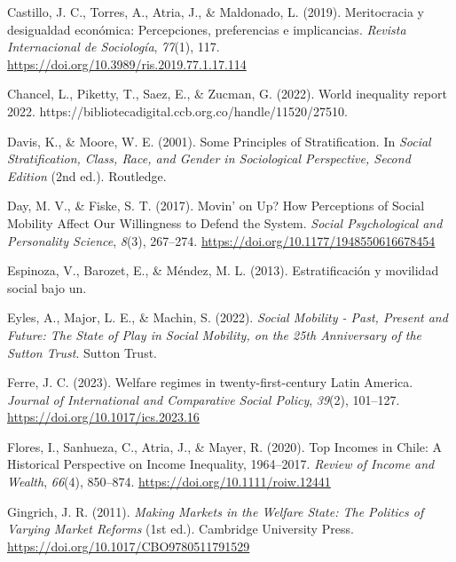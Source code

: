 \documentclass[
  12pt,
]{article}
\newlength{\cslhangindent}
\newenvironment{CSLReferences}[2] %
 {\begin{list}{}{%
  \setlength{\itemindent}{0pt}
  \setlength{\leftmargin}{0pt}
  \setlength{\parsep}{0pt}
  \ifodd #1
   \setlength{\leftmargin}{\cslhangindent}
   \setlength{\itemindent}{-1\cslhangindent}
  \fi
  \setlength{\itemsep}{#2\baselineskip}}}
 {\end{list}}
\begin{document}
\begin{CSLReferences}{1}{0}
Castillo, J. C., Torres, A., Atria, J., \& Maldonado, L. (2019).
Meritocracia y desigualdad econ{ó}mica: {Percepciones}, preferencias e
implicancias. \emph{Revista Internacional de Sociolog{í}a},
\emph{77}(1), 117. \url{https://doi.org/10.3989/ris.2019.77.1.17.114}

Chancel, L., Piketty, T., Saez, E., \& Zucman, G. (2022). World
inequality report 2022.
https://bibliotecadigital.ccb.org.co/handle/11520/27510.

Davis, K., \& Moore, W. E. (2001). Some {Principles} of
{Stratification}. In \emph{Social {Stratification}, {Class}, {Race}, and
{Gender} in {Sociological Perspective}, {Second Edition}} (2nd ed.).
Routledge.

Day, M. V., \& Fiske, S. T. (2017). Movin' on {Up}? {How Perceptions} of
{Social Mobility Affect Our Willingness} to {Defend} the {System}.
\emph{Social Psychological and Personality Science}, \emph{8}(3),
267--274. \url{https://doi.org/10.1177/1948550616678454}

Espinoza, V., Barozet, E., \& Méndez, M. L. (2013). {Estratificaci{ó}n y
movilidad social bajo un}.

Eyles, A., Major, L. E., \& Machin, S. (2022). \emph{Social {Mobility} -
{Past}, {Present} and {Future}: {The State} of {Play} in {Social
Mobility}, on the 25th {Anniversary} of the {Sutton Trust}}. Sutton
Trust.

Ferre, J. C. (2023). Welfare regimes in twenty-first-century {Latin
America}. \emph{Journal of International and Comparative Social Policy},
\emph{39}(2), 101--127. \url{https://doi.org/10.1017/ics.2023.16}

Flores, I., Sanhueza, C., Atria, J., \& Mayer, R. (2020). Top {Incomes}
in {Chile}: {A Historical Perspective} on {Income Inequality},
1964--2017. \emph{Review of Income and Wealth}, \emph{66}(4), 850--874.
\url{https://doi.org/10.1111/roiw.12441}

Gingrich, J. R. (2011). \emph{Making {Markets} in the {Welfare State}:
{The Politics} of {Varying Market Reforms}} (1st ed.). Cambridge
University Press. \url{https://doi.org/10.1017/CBO9780511791529}


\end{CSLReferences}
\end{document}
